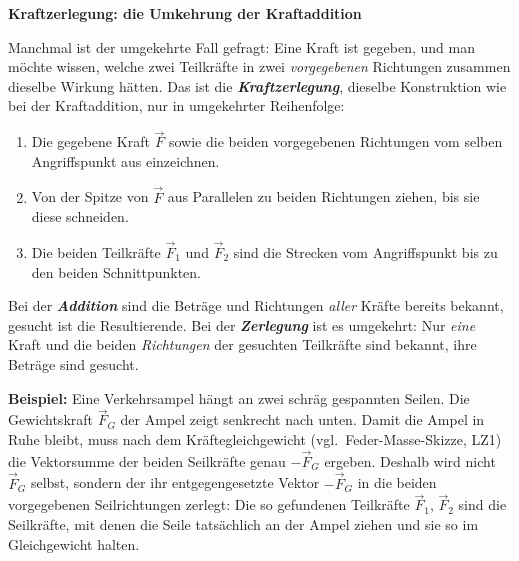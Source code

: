 \documentclass[addpoints,11pt,a4paper]{exam}
\newenvironment{theoriebox}[1][Theorie]{%
  \par\addvspace{10pt}\noindent\textbf{#1}\par\smallskip\noindent
}{%
  \par\addvspace{10pt}
}
\begin{document}
\begin{theoriebox}[Kraftzerlegung: die Umkehrung der Kraftaddition]
Manchmal ist der umgekehrte Fall gefragt: Eine Kraft ist gegeben, und man
möchte wissen, welche zwei Teilkräfte in zwei \emph{vorgegebenen} Richtungen
zusammen dieselbe Wirkung hätten. Das ist die \textbf{\emph{Kraftzerlegung}},
dieselbe Konstruktion wie bei der Kraftaddition, nur in umgekehrter
Reihenfolge:

\begin{enumerate}[leftmargin=1.2cm,itemsep=0.2em]
  \item Die gegebene Kraft $\vec F$ sowie die beiden vorgegebenen Richtungen
  vom selben Angriffspunkt aus einzeichnen.
  \item Von der Spitze von $\vec F$ aus Parallelen zu beiden Richtungen
  ziehen, bis sie diese schneiden.
  \item Die beiden Teilkräfte $\vec F_1$ und $\vec F_2$ sind die Strecken vom
  Angriffspunkt bis zu den beiden Schnittpunkten.
\end{enumerate}

\begin{hinweisbox}
Bei der \textbf{\emph{Addition}} sind die Beträge und Richtungen \emph{aller}
Kräfte bereits bekannt, gesucht ist die Resultierende. Bei der
\textbf{\emph{Zerlegung}} ist es umgekehrt: Nur \emph{eine} Kraft und die
beiden \emph{Richtungen} der gesuchten Teilkräfte sind bekannt, ihre Beträge
sind gesucht.
\end{hinweisbox}

\textbf{Beispiel:} Eine Verkehrsampel hängt an zwei schräg gespannten
Seilen. Die Gewichtskraft $\vec F_G$ der Ampel zeigt senkrecht nach unten.
Damit die Ampel in Ruhe bleibt, muss nach dem Kräftegleichgewicht
(vgl.\ Feder-Masse-Skizze, LZ1) die Vektorsumme der beiden Seilkräfte genau
$-\vec F_G$ ergeben. Deshalb wird nicht $\vec F_G$ selbst, sondern der ihr
entgegengesetzte Vektor $-\vec F_G$ in die beiden vorgegebenen
Seilrichtungen zerlegt: Die so gefundenen Teilkräfte $\vec F_1$, $\vec F_2$
sind die Seilkräfte, mit denen die Seile tatsächlich an der Ampel ziehen und
sie so im Gleichgewicht halten.


\end{theoriebox}
\end{document}
